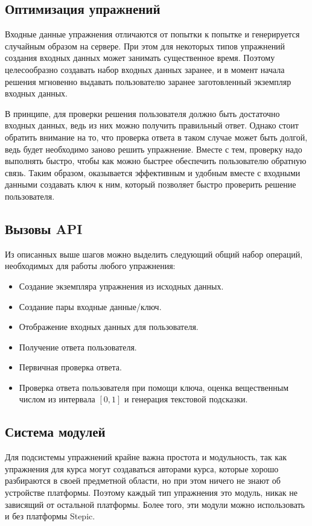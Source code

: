 \documentclass{matmex-diploma-custom}
\begin{document}
\subsection{Оптимизация упражнений}
Входные данные упражнения отличаются от попытки к попытке и
генерируется случайным образом на сервере. При этом для некоторых
типов упражнений создания входных данных может занимать существенное
время. Поэтому целесообразно создавать набор входных данных заранее, и
в момент начала решения мгновенно выдавать пользователю заранее
заготовленный экземпляр входных данных.

В принципе, для проверки решения пользователя должно быть достаточно
входных данных, ведь из них можно получить правильный ответ. Однако
стоит обратить внимание на то, что проверка ответа в таком случае
может быть долгой, ведь будет необходимо заново решить
упражнение. Вместе с тем, проверку надо выполнять быстро, чтобы как
можно быстрее обеспечить пользователю обратную связь. Таким образом,
оказывается эффективным и удобным вместе с входными данными создавать
ключ к ним, который позволяет быстро проверить решение пользователя.

\subsection{Вызовы API}
Из описанных выше шагов можно выделить следующий общий набор операций,
необходимых для работы любого упражнения:

\begin{itemize}
\item Создание экземпляра упражнения из исходных данных.
\item Создание пары входные данные/ключ.
\item Отображение входных данных для пользователя.
\item Получение ответа пользователя.
\item Первичная проверка ответа.
\item Проверка ответа пользователя при помощи ключа, оценка
  вещественным числом из интервала $[0, 1]$ и генерация текстовой подсказки.
\end{itemize}

\subsection{Система модулей}
Для подсистемы упражнений крайне важна простота и модульность, так как
упражнения для курса могут создаваться авторами курса, которые хорошо
разбираются в своей предметной области, но при этом ничего не знают об
устройстве платформы. Поэтому каждый тип упражнения это модуль, никак
не зависящий от остальной платформы. Более того, эти модули можно
использовать и без платформы Stepic.
\end{document}
